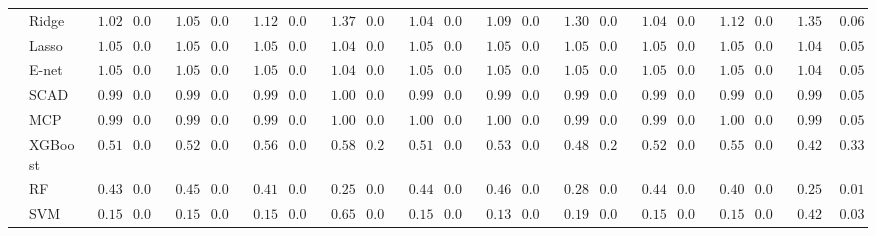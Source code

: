 \begin{tabular}{ll|ll|llllll|llllll|llllll}
 & Ridge  & $\phantom{0}1.02$ & $0.05$ & $\phantom{0}1.05$ & $0.05$ & $\phantom{0}1.12$ & $0.05$ & $\phantom{0}1.37$ & $0.07$ & $\phantom{0}1.04$ & $0.05$ & $\phantom{0}1.09$ & $0.06$ & $\phantom{0}1.30$ & $0.06$ & $\phantom{0}1.04$ & $0.05$ & $\phantom{0}1.12$ & $0.06$ & $\phantom{0}1.35$ & $\phantom{0}0.06$ \\
 & Lasso  & $\phantom{0}1.05$ & $0.05$ & $\phantom{0}1.05$ & $0.05$ & $\phantom{0}1.05$ & $0.05$ & $\phantom{0}1.04$ & $0.05$ & $\phantom{0}1.05$ & $0.05$ & $\phantom{0}1.05$ & $0.05$ & $\phantom{0}1.05$ & $0.05$ & $\phantom{0}1.05$ & $0.05$ & $\phantom{0}1.05$ & $0.05$ & $\phantom{0}1.04$ & $\phantom{0}0.05$ \\
 & E-net  & $\phantom{0}1.05$ & $0.05$ & $\phantom{0}1.05$ & $0.05$ & $\phantom{0}1.05$ & $0.05$ & $\phantom{0}1.04$ & $0.05$ & $\phantom{0}1.05$ & $0.05$ & $\phantom{0}1.05$ & $0.05$ & $\phantom{0}1.05$ & $0.05$ & $\phantom{0}1.05$ & $0.05$ & $\phantom{0}1.05$ & $0.05$ & $\phantom{0}1.04$ & $\phantom{0}0.05$ \\
 & SCAD  & $\phantom{0}0.99$ & $0.05$ & $\phantom{0}0.99$ & $0.05$ & $\phantom{0}0.99$ & $0.05$ & $\phantom{0}1.00$ & $0.05$ & $\phantom{0}0.99$ & $0.05$ & $\phantom{0}0.99$ & $0.05$ & $\phantom{0}0.99$ & $0.05$ & $\phantom{0}0.99$ & $0.05$ & $\phantom{0}0.99$ & $0.05$ & $\phantom{0}0.99$ & $\phantom{0}0.05$ \\
 & MCP  & $\phantom{0}0.99$ & $0.05$ & $\phantom{0}0.99$ & $0.05$ & $\phantom{0}0.99$ & $0.05$ & $\phantom{0}1.00$ & $0.05$ & $\phantom{0}1.00$ & $0.05$ & $\phantom{0}1.00$ & $0.05$ & $\phantom{0}0.99$ & $0.05$ & $\phantom{0}0.99$ & $0.05$ & $\phantom{0}1.00$ & $0.05$ & $\phantom{0}0.99$ & $\phantom{0}0.05$ \\
 & XGBoost  & $\phantom{0}0.51$ & $0.03$ & $\phantom{0}0.52$ & $0.03$ & $\phantom{0}0.56$ & $0.03$ & $\phantom{0}0.58$ & $0.26$ & $\phantom{0}0.51$ & $0.03$ & $\phantom{0}0.53$ & $0.03$ & $\phantom{0}0.48$ & $0.29$ & $\phantom{0}0.52$ & $0.03$ & $\phantom{0}0.55$ & $0.03$ & $\phantom{0}0.42$ & $\phantom{0}0.33$ \\
 & RF  & $\phantom{0}0.43$ & $0.02$ & $\phantom{0}0.45$ & $0.02$ & $\phantom{0}0.41$ & $0.02$ & $\phantom{0}0.25$ & $0.01$ & $\phantom{0}0.44$ & $0.02$ & $\phantom{0}0.46$ & $0.02$ & $\phantom{0}0.28$ & $0.01$ & $\phantom{0}0.44$ & $0.02$ & $\phantom{0}0.40$ & $0.02$ & $\phantom{0}0.25$ & $\phantom{0}0.01$ \\
 & SVM  & $\phantom{0}0.15$ & $0.01$ & $\phantom{0}0.15$ & $0.01$ & $\phantom{0}0.15$ & $0.01$ & $\phantom{0}0.65$ & $0.04$ & $\phantom{0}0.15$ & $0.01$ & $\phantom{0}0.13$ & $0.01$ & $\phantom{0}0.19$ & $0.01$ & $\phantom{0}0.15$ & $0.01$ & $\phantom{0}0.15$ & $0.01$ & $\phantom{0}0.42$ & $\phantom{0}0.03$ \\\hline

\end{tabular}
